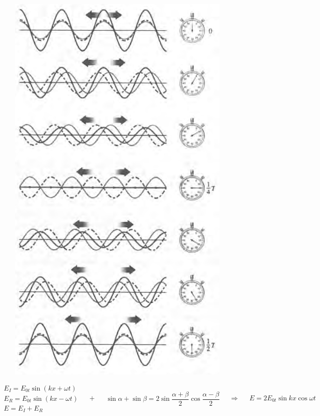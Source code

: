 \begin{figure}[H]
  \centering
  \includegraphics[width=0.7\linewidth]{figures/standing-wave.png}
\end{figure}

\begin{equation*}
  \begin{aligned}
    & E_I = E_{0t} \sin \left( k x + \omega t \right) \\
    & E_R = E_{0t} \sin \left( k x - \omega t \right) \\
    & E = E_I + E_R
  \end{aligned}
  \quad + \quad 
  \begin{aligned}
    \sin \alpha + \sin \beta = 2 \sin \dfrac{\alpha + \beta}{2} \cos \dfrac{\alpha - \beta}{2}  
  \end{aligned}
  \quad \Rightarrow \quad 
  \begin{aligned}
    E = 2 E_{0t} \sin kx \cos \omega t
  \end{aligned}
\end{equation*}

